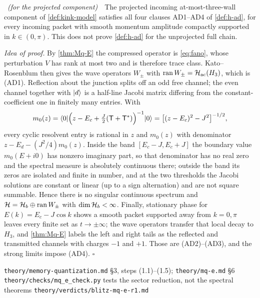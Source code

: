 \begin{corollary}
\label{cor:Mq-AD3}
\statusProved\ \emph{(for the projected component)}\ \ The projected incoming
at-most-three-wall component of \cref{def:kink-model} satisfies all four clauses
AD1--AD4 of \cref{def:h-ad}, for every incoming packet with smooth momentum
amplitude compactly supported in $k\in(0,\pi)$. This does not prove
\cref{def:h-ad} for the unprojected full chain.
\end{corollary}

\noindent\emph{Idea of proof.} By \cref{thm:Mq-E} the compressed operator is
\eqref{eq:fano}, whose perturbation $V$ has rank at most two and is therefore
trace class. Kato--Rosenblum then gives the wave operators $W_\pm$ with
$\operatorname{ran} W_\pm=\mathcal{H}_{\mathrm{ac}}(H_3)$, which is (AD1). Reflection about the
junction splits off an odd free channel; the even channel together with
$|d\rangle$ is a half-line Jacobi matrix differing from the constant-coefficient
one in finitely many entries. With
\begin{equation}
  m_0(z)=\langle 0|\Bigl(z-E_c+\tfrac{J}{2}(\mathsf{T}+\mathsf{T}^*)\Bigr)^{-1}|0\rangle
  =\bigl[(z-E_c)^2-J^2\bigr]^{-1/2},
\end{equation}
every cyclic resolvent entry is rational in $z$ and $m_0(z)$ with denominator
$z-E_d-(J^2/4)m_0(z)$. Inside the band $[E_c-J,E_c+J]$ the boundary value
$m_0(E+i0)$ has nonzero imaginary part, so that denominator has no real zero and
the spectral measure is absolutely continuous there; outside the band its zeros
are isolated and finite in number, and at the two thresholds the Jacobi
solutions are constant or linear (up to a sign alternation) and are not square
summable. Hence there is no singular continuous spectrum and
$\mathcal{H}=\mathcal{H}_b\oplus\operatorname{ran} W_\pm$ with $\dim\mathcal{H}_b<\infty$. Finally, stationary
phase for $E(k)=E_c-J\cos k$ shows a smooth packet supported away from
$k=0,\pi$ leaves every finite set as $t\to\pm\infty$; the wave operators
transfer that local decay to $H_3$, and \cref{thm:Mq-E} labels the left and
right tails as the reflected and transmitted channels with charges $-1$ and
$+1$. Those are (AD2)--(AD3), and the strong limits impose (AD4).
\hfill$\square$

%
{\texttt{theory/memory-quantization.md} \S3, steps (1.1)--(1.5);
 \texttt{theory/mq-e.md} \S6}%
{\texttt{theory/checks/mq\_e\_check.py} tests the sector reduction, not the
 spectral theorems}%
{\texttt{theory/verdicts/blitz-mq-e-r1.md}}

